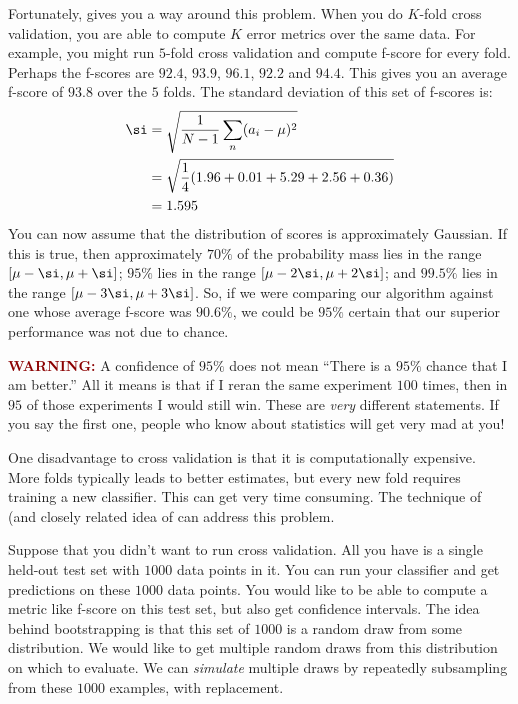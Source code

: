 Fortunately,  gives you a way around this
problem.  When you do $K$-fold cross validation, you are able to
compute $K$ error metrics over the same data.  For example, you might
run $5$-fold cross validation and compute f-score for every fold.
Perhaps the f-scores are $92.4$, $93.9$, $96.1$, $92.2$ and $94.4$.
This gives you an average f-score of $93.8$ over the $5$ folds.  The
standard deviation of this set of f-scores is:
\begin{align} \label{eq:prac:stddev}
\si
&= \sqrt{ \frac 1 {N-1} \sum_n (a_i - \mu)^2 } \\
&= \sqrt{ \frac 1 4 (1.96 + 0.01 + 5.29 + 2.56 + 0.36) } \\
&= 1.595
\end{align}
You can now assume that the distribution of scores is approximately
Gaussian.  If this is true, then approximately $70\%$ of the
probability mass lies in the range $[\mu-\si, \mu+\si]$; $95\%$ lies
in the range $[\mu-2\si,\mu+2\si]$; and $99.5\%$ lies in the range
$[\mu-3\si,\mu+3\si]$.  So, if we were comparing our algorithm against
one whose average f-score was $90.6\%$, we could be $95\%$ certain
that our superior performance was not due to chance.

\textcolor{darkred}{\bf WARNING:} A confidence of $95\%$ does not mean
``There is a $95\%$ chance that I am better.''  All it means is that
if I reran the same experiment $100$ times, then in $95$ of those
experiments I would still win.  These are \emph{very} different
statements.  If you say the first one, people who know about
statistics will get very mad at you!

One disadvantage to cross validation is that it is computationally
expensive.  More folds typically leads to better estimates, but every
new fold requires training a new classifier.  This can get very time
consuming.  The technique of  (and closely
related idea of  can address this problem.

Suppose that you didn't want to run cross validation.  All you have is
a single held-out test set with $1000$ data points in it.  You can run
your classifier and get predictions on these $1000$ data points.  You
would like to be able to compute a metric like f-score on this test
set, but also get confidence intervals.  The idea behind bootstrapping
is that this set of $1000$ is a random draw from some distribution.
We would like to get multiple random draws from this distribution on
which to evaluate.  We can \emph{simulate} multiple draws by
repeatedly subsampling from these $1000$ examples, with replacement.

